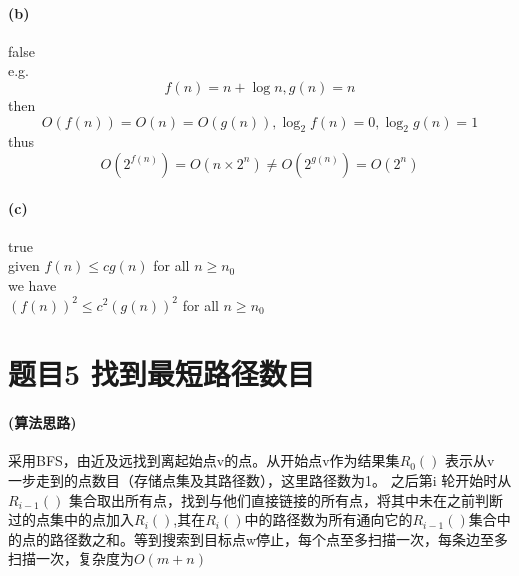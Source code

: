 \documentclass[a4paper,10pt]{article}
\begin{document}
  \paragraph{(b)}
  false\\
  e.g.
  $$f(n)=n+\log n, g(n)=n$$
  then
  $$O(f(n))=O(n)=O(g(n)), \log_2 f(n)=0, \log_2 g(n)=1$$
  thus
  $$O(2^{f(n)})=O(n\times 2^n)\neq O(2^{g(n)})=O(2^n)$$

  \paragraph{(c)}
  true\\
  given $f(n)\leqslant cg(n)$ for all $n\geqslant n_0$\\
  we have\\
  $(f(n))^2\leqslant c^2(g(n))^2$ for all $n\geqslant n_0$

\section{题目5 找到最短路径数目}
\paragraph{(算法思路)}
采用BFS，由近及远找到离起始点v的点。从开始点v作为结果集$R_0()$ 表示从v 一步走到的点数目（存储点集及其路径数），这里路径数为1。 之后第i 轮开始时从$R_{i-1}()$ 集合取出所有点，找到与他们直接链接的所有点，将其中未在之前判断过的点集中的点加入$R_i()$,其在$R_i()$中的路径数为所有通向它的$R_{i-1}()$集合中的点的路径数之和。等到搜索到目标点w停止，每个点至多扫描一次，每条边至多扫描一次，复杂度为$O(m+n)$
\end{document}
